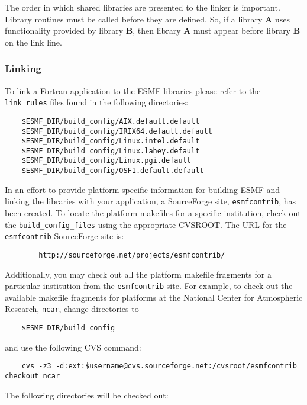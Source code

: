 The order in which shared libraries are presented to 
the linker is important. Library routines must be called before they are 
defined. So, if a library {\bf A} uses functionality provided by library 
{\bf B}, then library {\bf A} must appear before library {\bf B} on the 
link line. 

\subsubsection{Linking}

To link a Fortran application to the ESMF libraries please 
refer to the {\tt link\_rules} files found in the following directories:

\begin{verbatim}
	$ESMF_DIR/build_config/AIX.default.default
	$ESMF_DIR/build_config/IRIX64.default.default
	$ESMF_DIR/build_config/Linux.intel.default
	$ESMF_DIR/build_config/Linux.lahey.default
	$ESMF_DIR/build_config/Linux.pgi.default
	$ESMF_DIR/build_config/OSF1.default.default
\end{verbatim}

In an effort to provide platform specific information for building ESMF 
and linking the libraries with your application, a SourceForge 
site, {\tt esmfcontrib}, has been created.
To locate the platform makefiles for a specific institution, check out 
the {\tt build\_config\_files} using the appropriate CVSROOT.
The URL for the {\tt esmfcontrib} SourceForge site is:

\begin{verbatim}
        http://sourceforge.net/projects/esmfcontrib/
\end{verbatim}

Additionally, you may check out all the platform makefile fragments 
for a particular institution from the {\tt esmfcontrib} site. For example, 
to check out the available makefile fragments for platforms at the
National Center for Atmospheric Research, {\tt ncar}, change directories to

\begin{verbatim}
 	$ESMF_DIR/build_config
\end{verbatim}

and use the following CVS command:

\begin{verbatim}
	cvs -z3 -d:ext:$username@cvs.sourceforge.net:/cvsroot/esmfcontrib checkout ncar
\end{verbatim}

The following directories will be checked out:


